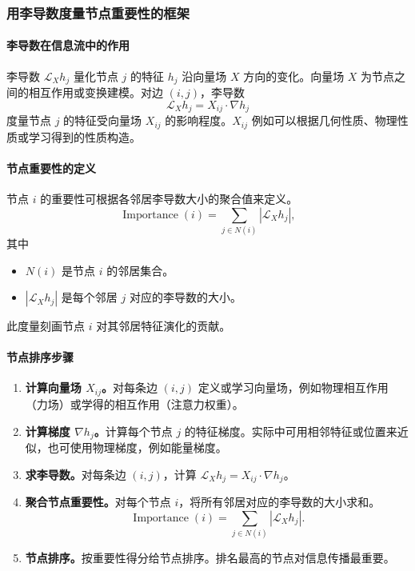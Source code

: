 \subsubsection{用李导数度量节点重要性的框架}
\paragraph{李导数在信息流中的作用}
李导数 $\mathcal L_X h_j$ 量化节点 $j$ 的特征 $h_j$ 沿向量场 $X$ 方向的变化。向量场 $X$ 为节点之间的相互作用或变换建模。对边 $(i,j)$，李导数
\[
  \mathcal L_X h_j=X_{ij}\cdot\nabla h_j
\]
度量节点 $j$ 的特征受向量场 $X_{ij}$ 的影响程度。$X_{ij}$ 例如可以根据几何性质、物理性质或学习得到的性质构造。

\paragraph{节点重要性的定义}
节点 $i$ 的重要性可根据各邻居李导数大小的聚合值来定义。
\[
  \operatorname{Importance}(i)=\sum_{j\in N(i)}|\mathcal L_X h_j|,
\]
其中
\begin{itemize}
  \item $N(i)$ 是节点 $i$ 的邻居集合。
  \item $|\mathcal L_X h_j|$ 是每个邻居 $j$ 对应的李导数的大小。
\end{itemize}
此度量刻画节点 $i$ 对其邻居特征演化的贡献。

\paragraph{节点排序步骤}
\begin{enumerate}
  \item \textbf{计算向量场 $X_{ij}$。}对每条边 $(i,j)$ 定义或学习向量场，例如物理相互作用（力场）或学得的相互作用（注意力权重）。
  \item \textbf{计算梯度 $\nabla h_j$。}计算每个节点 $j$ 的特征梯度。实际中可用相邻特征或位置来近似，也可使用物理梯度，例如能量梯度。
  \item \textbf{求李导数。}对每条边 $(i,j)$，计算 $\mathcal L_X h_j=X_{ij}\cdot\nabla h_j$。
  \item \textbf{聚合节点重要性。}对每个节点 $i$，将所有邻居对应的李导数的大小求和。
  \[
    \operatorname{Importance}(i)=\sum_{j\in N(i)}|\mathcal L_X h_j|.
  \]
  \item \textbf{节点排序。}按重要性得分给节点排序。排名最高的节点对信息传播最重要。
\end{enumerate}

